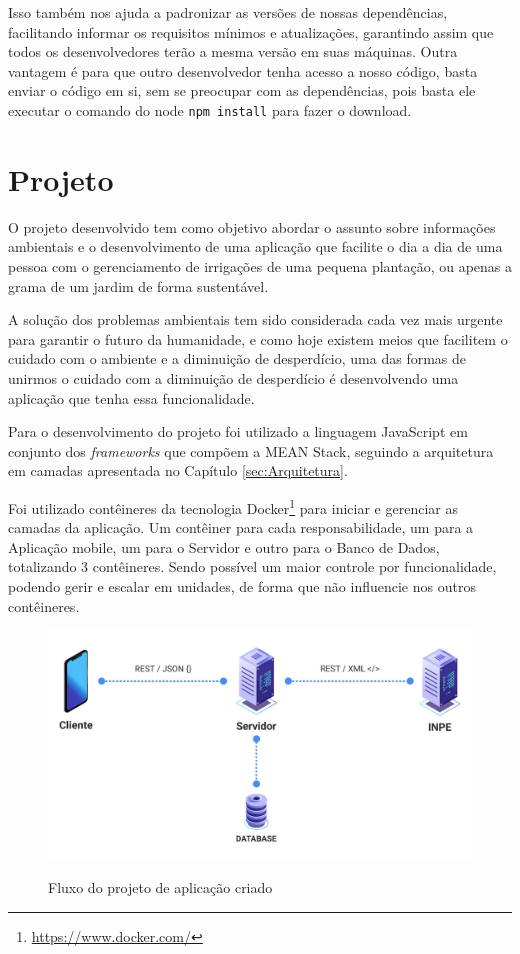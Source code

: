 \documentclass[
	12pt,				%
	openright,			%
	twoside,			%
	a4paper,			%
	english,			%
	brazil				%
	]{abntex2}
\begin{document}
Isso também nos ajuda a padronizar as versões de nossas dependências, facilitando informar os requisitos mínimos e atualizações, garantindo assim que todos os desenvolvedores terão a mesma versão em suas máquinas. Outra vantagem é para que outro desenvolvedor tenha acesso a nosso código, basta enviar o código em si, sem se preocupar com as dependências, pois basta ele executar o comando do node \verb|npm install| para fazer o download.

\chapter{Projeto}
\label{cap:Projeto}

O projeto desenvolvido tem como objetivo abordar o assunto sobre informações ambientais e o desenvolvimento de uma aplicação que facilite o dia a dia de uma pessoa com o gerenciamento de irrigações de uma pequena plantação, ou apenas a grama de um jardim de forma sustentável.

A solução dos problemas ambientais tem sido considerada cada vez mais urgente para garantir o futuro da humanidade, e como hoje existem meios que facilitem o cuidado com o ambiente e a diminuição de desperdício, uma das formas de unirmos o cuidado com a diminuição de desperdício é desenvolvendo uma aplicação que tenha essa funcionalidade.

Para o desenvolvimento do projeto foi utilizado a linguagem JavaScript em conjunto dos \textit{frameworks} que compõem a MEAN Stack, seguindo a arquitetura em camadas apresentada no Capítulo \ref{sec:Arquitetura}.

Foi utilizado contêineres da tecnologia Docker\footnote{\url{https://www.docker.com/}} para iniciar e gerenciar as camadas da aplicação. Um contêiner para cada responsabilidade, um para a Aplicação mobile, um para o Servidor e outro para o Banco de Dados, totalizando 3 contêineres. Sendo possível um maior controle por funcionalidade, podendo gerir e escalar em unidades, de forma que não influencie nos outros contêineres.

\begin{figure}[h]
	\centering

	\caption{Fluxo do projeto de aplicação criado} \label{fig:ProjectFlow}
    \includegraphics[scale=0.35]{project-flow} \\

\end{figure}
\end{document}
